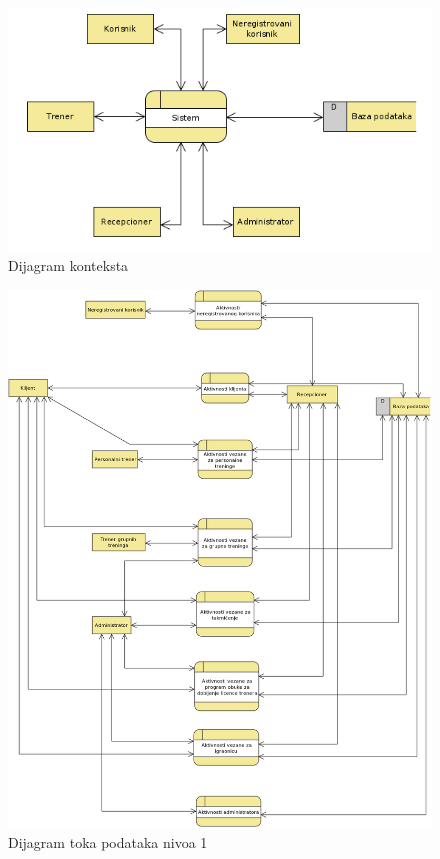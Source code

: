 \begin{figure}[!ht]
\begin{center}
\includegraphics[scale=0.55]{sections/images/dijagram_konteksta.png}
\end{center}
\caption{Dijagram konteksta}
\label{fig:kontekst}
\end{figure}

\newpage
\begin{figure}[!ht]
\begin{center}
\includegraphics[scale=0.45]{sections/images/dtp_nivoa_1.png}
\end{center}
\caption{Dijagram toka podataka nivoa 1}
\label{fig:kontekst}
\end{figure}
